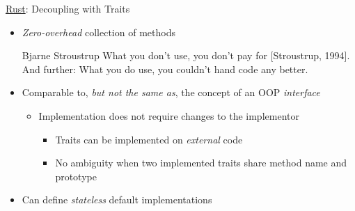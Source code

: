 \begin{frame}[fragile]{\underline{Rust}: Decoupling with Traits \hfill {\footnotesize \currentname}}


    \begin{itemize}

        \item \textit{Zero-overhead} collection of methods\\[3pt]
            { \footnotesize
            \begin{aquote}{\footnotesize Bjarne Stroustrup}
                What you don't use, you don't pay for [Stroustrup, 1994]. And further: What you do use, you couldn't hand code any better.
            \end{aquote} }

        \item Comparable to, \textit{but not the same as}, the concept of an OOP \textit{interface}\\
            \begin{itemize}
                \item Implementation does not require changes to the implementor
                \begin{itemize}
                    \item Traits can be implemented on \textit{external} code
                    \item No ambiguity when two implemented traits share method name and prototype
                \end{itemize}
            \end{itemize}

        \item Can define \textit{stateless} default implementations\\

    \end{itemize}

    \vfill

\end{frame}

